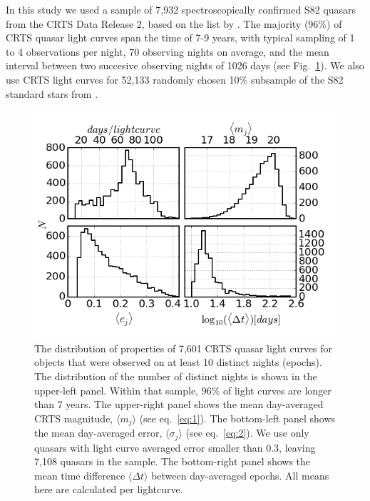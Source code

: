 \documentclass[fleqn,usenatbib]{mnras}  %
\begin{document}
In this study we used a sample of 7,932 spectroscopically confirmed S82 quasars from the CRTS Data Release 2, based 
on the list by \cite{macleod2011}.  The majority (96\%) of  CRTS quasar light curves span the time of 7-9 years, 
with typical sampling of 1 to 4 observations per night, 70 observing nights on average, and the 
mean interval between two succesive observing nights of 1026  days (see Fig.~\ref{fig:1}). We also use CRTS light curves for 52,133 randomly chosen 10\% subsample of the S82 
standard stars from \cite{ivezic2007}. 
\begin{figure}
\vskip -0.2in
\includegraphics[width=1.04\columnwidth]{Fig_1_QSO_CRTS_proc_stats.png}
\vskip -0.1in
\caption{The distribution of properties of 7,601 CRTS quasar light curves for objects that were observed 
on at least 10 distinct nights (epochs). The  distribution of the number of distinct nights is shown in the 
upper-left panel. Within that sample, $96\%$ of light curves are longer than 7 years.  The upper-right panel 
shows the mean day-averaged CRTS magnitude, $\langle  m_{j} \rangle$ (see eq.~\ref{eq:1}). 
The bottom-left panel shows the  mean day-averaged error, $\langle \sigma_{j} \rangle$ (see eq.~\ref{eq:2}). 
We use only quasars with light curve averaged error smaller than 0.3, leaving 7,108 quasars in the sample.
The bottom-right panel shows the mean time difference $\langle \Delta t \rangle$ between day-averaged epochs. 
All means here are calculated per lightcurve. }
\label{fig:1}
\end{figure}
\end{document}
